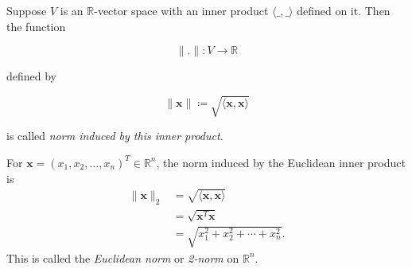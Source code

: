 \begin{definition}
	Suppose \( V \) is an \( \mathbb{R} \)-vector space with an inner product  \( \langle \_,\_ \rangle \) defined on it. Then the function

	\begin{equation}
		\|.\| : V \to \mathbb{R}
		\label{eq:norm-induced-by-an-inner-product-1}
	\end{equation}

	defined by

	\begin{equation}
		\|\mathbf{x}\| \coloneq \sqrt{\langle \mathbf{x}, \mathbf{x}\rangle}
		\label{eq:norm-induced-by-an-inner-product-2}
	\end{equation}

	is called \emph{norm induced by this inner product}.
\end{definition}

\begin{example}\label{ex:euclidean-norm}
	For $\mathbf{x}=(x_1,x_2,\ldots,x_n)^T\in\mathbb{R}^n$,
	the norm induced by the Euclidean inner product is
	\begin{align*}
		\|\mathbf{x}\|_2
		 & = \sqrt{\langle\mathbf{x},\mathbf{x}\rangle} \\
		 & = \sqrt{\mathbf{x}^T\mathbf{x}}              \\
		 & = \sqrt{x_1^2+x_2^2+\cdots+x_n^2}.
	\end{align*}
	This is called the \emph{Euclidean norm} or \emph{2-norm}
	on $\mathbb{R}^n$.
\end{example}

